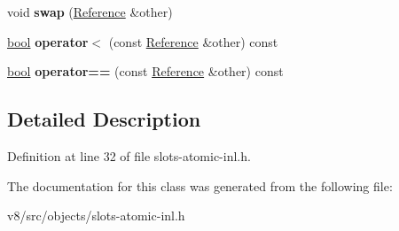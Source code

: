 \begin{DoxyCompactItemize}
void {\bfseries swap} (\mbox{\hyperlink{classv8_1_1internal_1_1AtomicSlot_1_1Reference}{Reference}} \&other)
\item 
\mbox{\label{classv8_1_1internal_1_1AtomicSlot_1_1Reference_a3d0c6cb2fd16c4b708f956584238af41}} 
\mbox{\hyperlink{classbool}{bool}} {\bfseries operator$<$} (const \mbox{\hyperlink{classv8_1_1internal_1_1AtomicSlot_1_1Reference}{Reference}} \&other) const
\item 
\mbox{\label{classv8_1_1internal_1_1AtomicSlot_1_1Reference_aaef5b0dbfda2ae5ca499467a50d2888a}} 
\mbox{\hyperlink{classbool}{bool}} {\bfseries operator==} (const \mbox{\hyperlink{classv8_1_1internal_1_1AtomicSlot_1_1Reference}{Reference}} \&other) const
\end{DoxyCompactItemize}


\subsection{Detailed Description}


Definition at line 32 of file slots-\/atomic-\/inl.\+h.



The documentation for this class was generated from the following file\+:\begin{DoxyCompactItemize}
\item 
v8/src/objects/slots-\/atomic-\/inl.\+h\end{DoxyCompactItemize}
